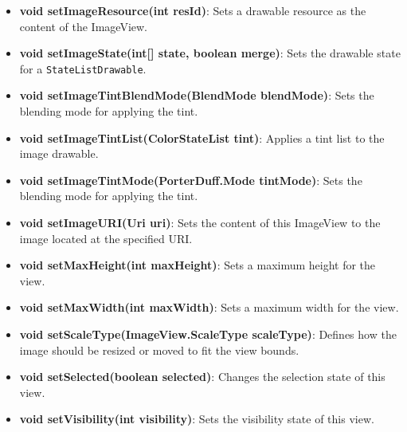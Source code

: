 \documentclass{report}
\begin{document}
\begin{itemize}
\begin{itemize}
                \item \textbf{void setImageResource(int resId)}: Sets a drawable resource as the content of the ImageView.
                \item \textbf{void setImageState(int[] state, boolean merge)}: Sets the drawable state for a \texttt{StateListDrawable}.
                \item \textbf{void setImageTintBlendMode(BlendMode blendMode)}: Sets the blending mode for applying the tint.
                \item \textbf{void setImageTintList(ColorStateList tint)}: Applies a tint list to the image drawable.
                \item \textbf{void setImageTintMode(PorterDuff.Mode tintMode)}: Sets the blending mode for applying the tint.
                \item \textbf{void setImageURI(Uri uri)}: Sets the content of this ImageView to the image located at the specified URI.
                \item \textbf{void setMaxHeight(int maxHeight)}: Sets a maximum height for the view.
                \item \textbf{void setMaxWidth(int maxWidth)}: Sets a maximum width for the view.
                \item \textbf{void setScaleType(ImageView.ScaleType scaleType)}: Defines how the image should be resized or moved to fit the view bounds.
                \item \textbf{void setSelected(boolean selected)}: Changes the selection state of this view.
                \item \textbf{void setVisibility(int visibility)}: Sets the visibility state of this view.
            \end{itemize}


\end{itemize}
\end{document}
